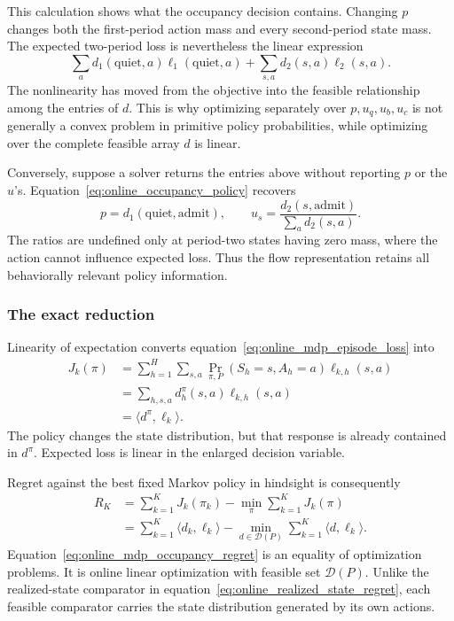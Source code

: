 This calculation shows what the occupancy decision contains. Changing $p$ changes both the first-period action mass and every second-period state mass. The expected two-period loss is nevertheless the linear expression
\begin{equation}
\sum_a d_1(\text{quiet},a)\ell_1(\text{quiet},a)
+
\sum_{s,a}d_2(s,a)\ell_2(s,a).
\label{eq:online_two_period_linear_loss}
\end{equation}
The nonlinearity has moved from the objective into the feasible relationship among the entries of $d$. This is why optimizing separately over $p,u_q,u_b,u_c$ is not generally a convex problem in primitive policy probabilities, while optimizing over the complete feasible array $d$ is linear.

Conversely, suppose a solver returns the entries above without reporting $p$ or the $u$'s. Equation~\eqref{eq:online_occupancy_policy} recovers
\[
p=d_1(\text{quiet},\text{admit}),
\qquad
u_s=\frac{d_2(s,\text{admit})}{\sum_a d_2(s,a)}.
\]
The ratios are undefined only at period-two states having zero mass, where the action cannot influence expected loss. Thus the flow representation retains all behaviorally relevant policy information.

\subsubsection{The exact reduction}

Linearity of expectation converts equation~\eqref{eq:online_mdp_episode_loss} into
\begin{align}
J_k(\pi)
&=
\sum_{h=1}^H\sum_{s,a}
\Pr_{\pi,P}(S_h=s,A_h=a)\ell_{k,h}(s,a)
\nonumber\\
&=
\sum_{h,s,a}
d_h^\pi(s,a)\ell_{k,h}(s,a)
\nonumber\\
&=
\langle d^\pi,\ell_k\rangle.
\label{eq:online_occupancy_identity}
\end{align}
The policy changes the state distribution, but that response is already contained in $d^\pi$. Expected loss is linear in the enlarged decision variable.

Regret against the best fixed Markov policy in hindsight is consequently
\begin{align}
R_K
&=
\sum_{k=1}^KJ_k(\pi_k)
-
\min_\pi\sum_{k=1}^KJ_k(\pi)
\nonumber\\
&=
\sum_{k=1}^K\langle d_k,\ell_k\rangle
-
\min_{d\in\mathcal D(P)}
\sum_{k=1}^K\langle d,\ell_k\rangle.
\label{eq:online_mdp_occupancy_regret}
\end{align}
Equation~\eqref{eq:online_mdp_occupancy_regret} is an equality of optimization problems. It is online linear optimization with feasible set $\mathcal D(P)$. Unlike the realized-state comparator in equation~\eqref{eq:online_realized_state_regret}, each feasible comparator carries the state distribution generated by its own actions.

